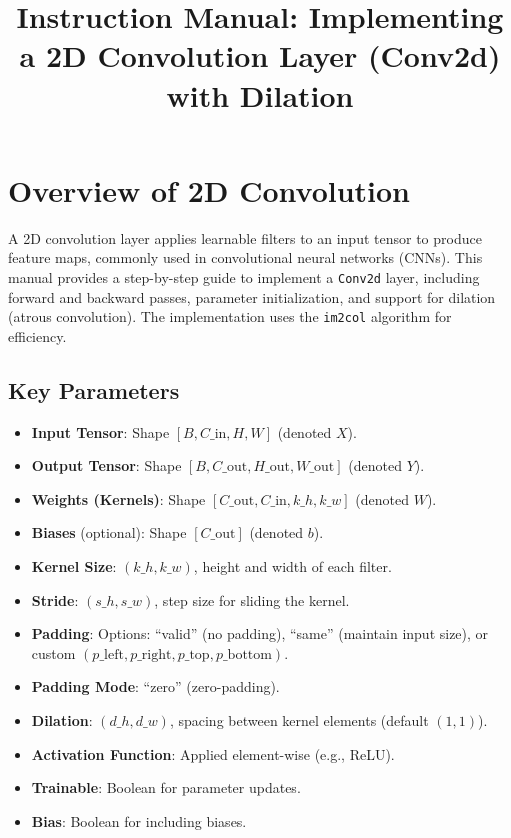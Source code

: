 \documentclass{article}
\begin{document}
\title{Instruction Manual: Implementing a 2D Convolution Layer (Conv2d) with Dilation}
\author{}
\date{}
\maketitle

\section{Overview of 2D Convolution}

A 2D convolution layer applies learnable filters to an input tensor to produce feature maps, commonly used in convolutional neural networks (CNNs). This manual provides a step-by-step guide to implement a \texttt{Conv2d} layer, including forward and backward passes, parameter initialization, and support for dilation (atrous convolution). The implementation uses the \texttt{im2col} algorithm for efficiency.

\subsection{Key Parameters}
\begin{itemize}
    \item \textbf{Input Tensor}: Shape $[B, C\_{\text{in}}, H, W]$ (denoted $X$).
    \item \textbf{Output Tensor}: Shape $[B, C\_{\text{out}}, H\_{\text{out}}, W\_{\text{out}}]$ (denoted $Y$).
    \item \textbf{Weights (Kernels)}: Shape $[C\_{\text{out}}, C\_{\text{in}}, k\_h, k\_w]$ (denoted $W$).
    \item \textbf{Biases} (optional): Shape $[C\_{\text{out}}]$ (denoted $b$).
    \item \textbf{Kernel Size}: $(k\_h, k\_w)$, height and width of each filter.
    \item \textbf{Stride}: $(s\_h, s\_w)$, step size for sliding the kernel.
    \item \textbf{Padding}: Options: ``valid'' (no padding), ``same'' (maintain input size), or custom $(p\_{\text{left}}, p\_{\text{right}}, p\_{\text{top}}, p\_{\text{bottom}})$.
    \item \textbf{Padding Mode}: ``zero'' (zero-padding).
    \item \textbf{Dilation}: $(d\_h, d\_w)$, spacing between kernel elements (default $(1, 1)$).
    \item \textbf{Activation Function}: Applied element-wise (e.g., ReLU).
    \item \textbf{Trainable}: Boolean for parameter updates.
    \item \textbf{Bias}: Boolean for including biases.
\end{itemize}
\end{document}
